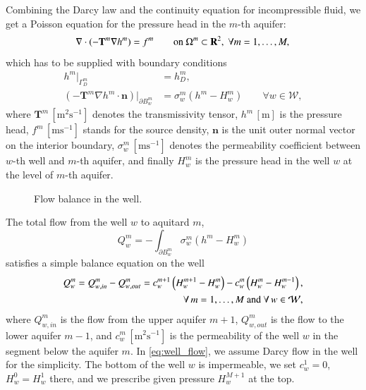 \documentclass{elsarticle}
\newcommand{\figpath}{../graphics/}
\def\vc#1{\mathbf{\boldsymbol{#1}}}     %
\def\prtl{\partial}
\newcommand{\R}{\mathbf{R}}
\begin{document}
Combining the Darcy law and the continuity equation for incompressible fluid, we get
a Poisson equation for the pressure head in the $m$-th aquifer:
\begin{equation} \label{eqn:poisson}
\nabla\cdot(-\mathbf{T}^m\nabla h^m) = f^m \qquad \textrm{on } \Omega^m\subset\R^2,\; \forall m=1,\dots,M, \\
\end{equation}
which has to be supplied with boundary conditions
\begin{align}
h^m|_{\Gamma^m_D} &= h^m_D, \\
\label{eq:interior_bc}
\left(-\mathbf{T}^m\nabla h^m\cdot\vc{n}\right)|_{\partial B^m_w} &= \sigma^m_w(h^m - H^m_w) \qquad \forall w\in\mathcal{W},
\end{align}
where $\mathbf{T}^m\, [\textrm{m}^2\textrm{s}^{-1}]$ denotes the transmissivity tensor,
$h^m\, [\textrm{m}]$ is the pressure head, $f^m\, [\textrm{m}\textrm{s}^{-1}]$ stands for the source density,
$\vc{n}$ is the unit outer normal vector on the interior boundary,
$\sigma^m_w\, [\textrm{m}\textrm{s}^{-1}]$ denotes the permeability coefficient between $w$-th well and 
$m$-th aquifer, and finally $H_w^m$ is the pressure head in the well $w$ at the level of $m$-th aquifer.
%
\begin{figure}[!htb]
  \begin{center}         
    \def\svgwidth{0.5\textwidth}
    
  \end{center}
  \caption{Flow balance in the well.}
  \label{fig:well_flows}
\end{figure}
%
The total flow from the well $w$ to aquitard $m$,
\[
    Q^m_w =-\int_{\prtl B^m_w} \sigma^m_w(h^m - H^m_w)
\]
satisfies a simple balance equation on the well
\begin{align}
    \label{eq:well_flow}
    Q_w^m = Q^m_{w,in} - Q^m_{w,out} = c^{m+1}_w\left( H^{m+1}_w-H^m_w \right) - c_w^m\left( H^m_w-H_w^{m-1}\right),&\\
    \notag
    \forall\,m=1,\dots,M\text{ and }\forall\,w\in\mathcal{W},&
\end{align}
where $Q^m_{w,in}$ is the flow from the upper aquifer $m+1$, $Q^m_{w,out}$ is the flow to the lower aquifer $m-1$, and 
$c^m_w\, [\textrm{m}^2\textrm{s}^{-1}]$ is the permeability of the well $w$ in the segment below the aquifer $m$.
%
In \eqref{eq:well_flow}, we assume Darcy flow in the well for the simplicity. The bottom of the well $w$ is impermeable,
we set $c^1_w=0$, $H^0_w=H^1_w$ there, and we prescribe given pressure $H^{M+1}_w$ at the top.
\end{document}
